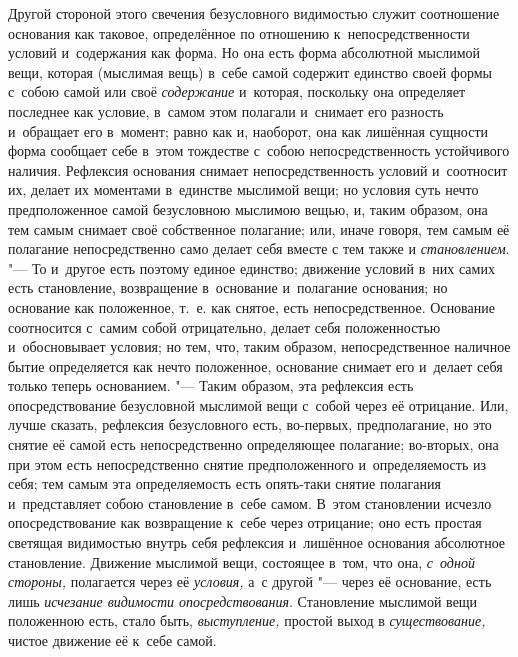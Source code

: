 Другой стороной этого свечения безусловного видимостью служит соотношение
основания как таковое, определённое по отношению к~непосредственности
условий и~содержания как форма. Но она есть форма абсолютной мыслимой вещи,
которая (мыслимая вещь) в~себе самой содержит единство своей формы с~собою
самой или своё {\em содержание} и~которая, поскольку
она определяет последнее как условие, в~самом этом полагали и~снимает его
разность и~обращает его в~момент; равно как и, наоборот, она как лишённая
сущности форма сообщает себе в~этом тождестве с~собою непосредственность
устойчивого наличия. Рефлексия основания снимает непосредственность условий
и~соотносит их, делает их моментами в~единстве мыслимой вещи; но условия
суть нечто предположенное самой безусловною мыслимою вещью, и, таким
образом, она тем самым снимает своё собственное полагание; или, иначе
говоря, тем самым её полагание непосредственно само делает себя вместе с
тем также и {\em становлением}. "--- То и~другое есть
поэтому единое единство; движение условий в~них самих есть становление,
возвращение в~основание и~полагание основания; но основание как положенное,
т.~е. как снятое, есть непосредственное. Основание соотносится с~самим
собой отрицательно, делает себя положенностью и~обосновывает условия; но
тем, что, таким образом, непосредственное наличное бытие определяется как
нечто положенное, основание снимает его и~делает себя только теперь
основанием. "--- Таким образом, эта рефлексия есть опосредствование
безусловной мыслимой вещи с~собой через её отрицание. Или, лучше сказать,
рефлексия безусловного есть, во-первых, предполагание, но это снятие её
самой есть непосредственно определяющее полагание; во-вторых, она при этом
есть непосредственно снятие предположенного и~определяемость из себя; тем
самым эта определяемость есть опять-таки снятие полагания и~представляет
собою становление в~себе самом. В~этом становлении исчезло опосредствование
как возвращение к~себе через отрицание; оно есть простая светящая
видимостью внутрь себя рефлексия и~лишённое основания абсолютное
становление. Движение мыслимой вещи, состоящее в~том, что она,
{\em с~одной стороны,} полагается через её
{\em условия,} а~с другой "--- через её основание, есть
лишь {\em исчезание видимости опосредствования}.
Становление мыслимой вещи положенною есть, стало быть,
{\em выступление,} простой выход в
{\em существование,} чистое движение её к~себе самой.

